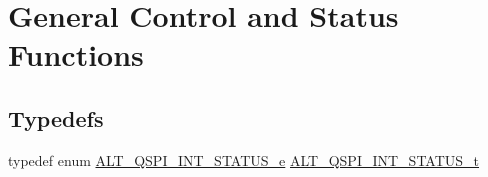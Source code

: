 \hypertarget{group__ALT__QSPI__CSR}{}\section{General Control and Status Functions}
\label{group__ALT__QSPI__CSR}
\subsection*{Typedefs}
\begin{DoxyCompactItemize}
\item 
typedef enum \mbox{\hyperlink{group__ALT__QSPI__CSR_ga919562dd181acc42914bea253e31fae1}{A\+L\+T\+\_\+\+Q\+S\+P\+I\+\_\+\+I\+N\+T\+\_\+\+S\+T\+A\+T\+U\+S\+\_\+e}} \mbox{\hyperlink{group__ALT__QSPI__CSR_ga9630d0374a96983752d4053c122665dd}{A\+L\+T\+\_\+\+Q\+S\+P\+I\+\_\+\+I\+N\+T\+\_\+\+S\+T\+A\+T\+U\+S\+\_\+t}}
\end{DoxyCompactItemize}
